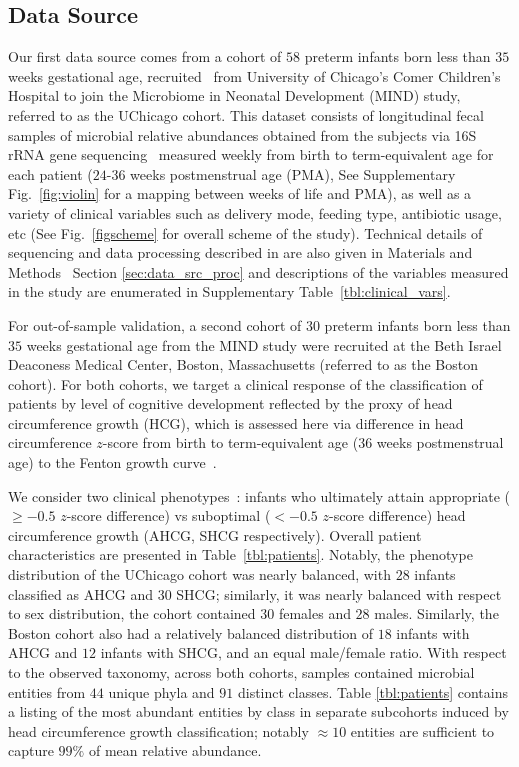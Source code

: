\documentclass[onecolumn,10pt]{IEEEtran}
\def\Methods{Materials and Methods}
\def\SPREFIX{S-}
\def\SPREFIX{}
\def\SUPPLEMENTARY{Supplementary\xspace}
\begin{document}
\subsection*{Data Source}
Our first data source comes from a cohort of $58$ preterm infants born less than $35$ weeks gestational age, recruited~\cite{oliphant2021bacteroidota} from University of Chicago's Comer Children's Hospital to join the  Microbiome in Neonatal Development (MIND) study, referred to as the UChicago cohort.  This dataset consists of longitudinal fecal samples of microbial relative abundances obtained from the subjects via 16S rRNA gene sequencing~\cite{walters2016improved,caporaso2012ultra} measured weekly from birth to term-equivalent age for each patient ($24$-$36$ weeks postmenstrual age (PMA), See \SUPPLEMENTARY Fig.~\SPREFIX\ref{fig:violin} for a mapping between weeks of life and PMA), as well as a variety of clinical variables such as delivery mode, feeding type, antibiotic usage, etc (See Fig.~\ref{figscheme} for overall scheme of the study). Technical details of sequencing and data processing described in \cite{oliphant2021bacteroidota} are also given in \Methods~ Section \ref{sec:data_src_proc} and descriptions of the variables measured in the study are enumerated in \SUPPLEMENTARY Table~\SPREFIX\ref{tbl:clinical_vars}. 

For out-of-sample validation, a second cohort of $30$ preterm infants born less than $35$ weeks gestational age from the MIND study were recruited at the Beth Israel Deaconess Medical Center, Boston, Massachusetts (referred to as the Boston cohort). For both cohorts, we target a clinical response of the classification of patients by level of cognitive development reflected by the proxy of head circumference growth (HCG), which is assessed here via difference in head circumference $z$-score from birth to term-equivalent age ($36$ weeks postmenstrual age) to the Fenton growth curve~\cite{fenton2013systematic,cordova2020association}. 

We consider two clinical phenotypes~\cite{oliphant2021bacteroidota}: infants who ultimately attain appropriate ($\geq -0.5$ $z$-score difference) vs suboptimal ($< -0.5$ $z$-score difference) head circumference growth (AHCG, SHCG respectively).  Overall patient characteristics are presented in Table~\ref{tbl:patients}. Notably, the phenotype distribution of the UChicago cohort was nearly balanced, with $28$ infants classified as AHCG and $30$ SHCG; similarly, it was nearly balanced with respect to sex distribution, the cohort contained $30$ females and $28$ males. Similarly, the Boston cohort also had a relatively balanced distribution of $18$ infants with AHCG and $12$ infants with SHCG, and an equal male/female ratio.  With respect to the observed taxonomy, across both cohorts, samples contained microbial entities from $44$ unique phyla and $91$ distinct classes. Table \ref{tbl:patients} contains a listing of the most abundant entities by class in separate subcohorts induced by head circumference growth classification; notably $\approx 10$ entities are sufficient to capture $99\%$ of mean relative abundance.
\end{document}
